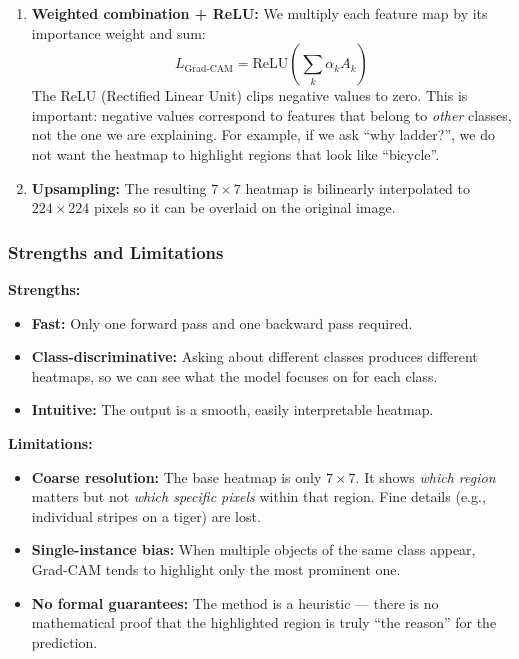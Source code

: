 \documentclass[12pt, a4paper]{article}
\begin{document}
\begin{enumerate}[leftmargin=*]
    \item \textbf{Weighted combination + ReLU:} We multiply each feature map
          by its importance weight and sum:
          \begin{equation}
          L_{\text{Grad-CAM}} = \text{ReLU}\left(\sum_k \alpha_k A_k\right)
          \end{equation}
          The ReLU (Rectified Linear Unit) clips negative values to zero.
          This is important: negative values correspond to features that
          belong to \emph{other} classes, not the one we are explaining.
          For example, if we ask ``why ladder?'', we do not want the
          heatmap to highlight regions that look like ``bicycle''.

    \item \textbf{Upsampling:} The resulting $7 \times 7$ heatmap is bilinearly
          interpolated to $224 \times 224$ pixels so it can be overlaid on the
          original image.
\end{enumerate}

\subsubsection{Strengths and Limitations}

\textbf{Strengths:}
\begin{itemize}[leftmargin=*]
    \item \textbf{Fast:} Only one forward pass and one backward pass required.
    \item \textbf{Class-discriminative:} Asking about different classes produces
          different heatmaps, so we can see what the model focuses on for each
          class.
    \item \textbf{Intuitive:} The output is a smooth, easily interpretable
          heatmap.
\end{itemize}

\textbf{Limitations:}
\begin{itemize}[leftmargin=*]
    \item \textbf{Coarse resolution:} The base heatmap is only $7 \times 7$.
          It shows \emph{which region} matters but not \emph{which specific
          pixels} within that region.  Fine details (e.g., individual stripes
          on a tiger) are lost.
    \item \textbf{Single-instance bias:} When multiple objects of the same
          class appear, Grad-CAM tends to highlight only the most prominent
          one.
    \item \textbf{No formal guarantees:} The method is a heuristic --- there
          is no mathematical proof that the highlighted region is truly
          ``the reason'' for the prediction.
\end{itemize}
\end{document}
